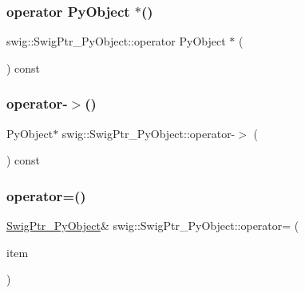 \subsubsection{\texorpdfstring{operator Py\+Object $\ast$()}{operator PyObject *()}}
{\footnotesize\ttfamily swig\+::\+Swig\+Ptr\+\_\+\+Py\+Object\+::operator Py\+Object $\ast$ (\begin{DoxyParamCaption}{ }\end{DoxyParamCaption}) const\hspace{0.3cm}{\ttfamily [inline]}}

\mbox{\label{classswig_1_1_swig_ptr___py_object_abcd310284d78ccf1041fb60906bc115e}} 
\subsubsection{\texorpdfstring{operator-\/$>$()}{operator->()}}
{\footnotesize\ttfamily Py\+Object$\ast$ swig\+::\+Swig\+Ptr\+\_\+\+Py\+Object\+::operator-\/$>$ (\begin{DoxyParamCaption}{ }\end{DoxyParamCaption}) const\hspace{0.3cm}{\ttfamily [inline]}}

\mbox{\label{classswig_1_1_swig_ptr___py_object_a86d8657d6b4a27c8e9e6942bc1ba572c}} 
\subsubsection{\texorpdfstring{operator=()}{operator=()}}
{\footnotesize\ttfamily \hyperlink{classswig_1_1_swig_ptr___py_object}{Swig\+Ptr\+\_\+\+Py\+Object}\& swig\+::\+Swig\+Ptr\+\_\+\+Py\+Object\+::operator= (\begin{DoxyParamCaption}\item[{const \hyperlink{classswig_1_1_swig_ptr___py_object}{Swig\+Ptr\+\_\+\+Py\+Object} \&}]{item }\end{DoxyParamCaption})\hspace{0.3cm}{\ttfamily [inline]}}



